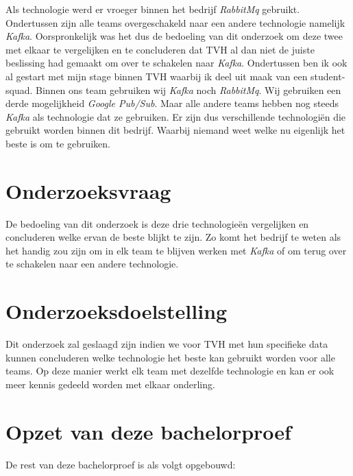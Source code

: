 Als technologie werd er vroeger binnen het bedrijf \emph{RabbitMq} gebruikt. Ondertussen zijn alle teams overgeschakeld naar een andere technologie namelijk \emph{Kafka}. Oorspronkelijk was het dus de bedoeling van dit onderzoek om deze twee met elkaar te vergelijken en te concluderen dat TVH al dan niet de juiste beslissing had gemaakt om over te schakelen naar \emph{Kafka}. Ondertussen ben ik ook al gestart met mijn stage binnen TVH waarbij ik deel uit maak van een student-squad. Binnen ons team gebruiken wij \emph{Kafka} noch \emph{RabbitMq}. Wij gebruiken een derde mogelijkheid \emph{Google Pub/Sub}. Maar alle andere teams hebben nog steeds \emph{Kafka} als technologie dat ze gebruiken. Er zijn dus verschillende technologiën die gebruikt worden binnen dit bedrijf. Waarbij niemand weet welke nu eigenlijk het beste is om te gebruiken. 

\section{Onderzoeksvraag}
\label{sec:onderzoeksvraag}

De bedoeling van dit onderzoek is deze drie technologieën vergelijken en concluderen welke ervan de beste blijkt te zijn. Zo komt het bedrijf te weten als het handig zou zijn om in elk team te blijven werken met \emph{Kafka} of om terug over te schakelen naar een andere technologie. 

\section{Onderzoeksdoelstelling}
\label{sec:onderzoeksdoelstelling}

Dit onderzoek zal geslaagd zijn indien we voor TVH met hun specifieke data kunnen concluderen welke technologie het beste kan gebruikt worden voor alle teams. Op deze manier werkt elk team met dezelfde technologie en kan er ook meer kennis gedeeld worden met elkaar onderling.

\section{Opzet van deze bachelorproef}
\label{sec:opzet-bachelorproef}


De rest van deze bachelorproef is als volgt opgebouwd:

